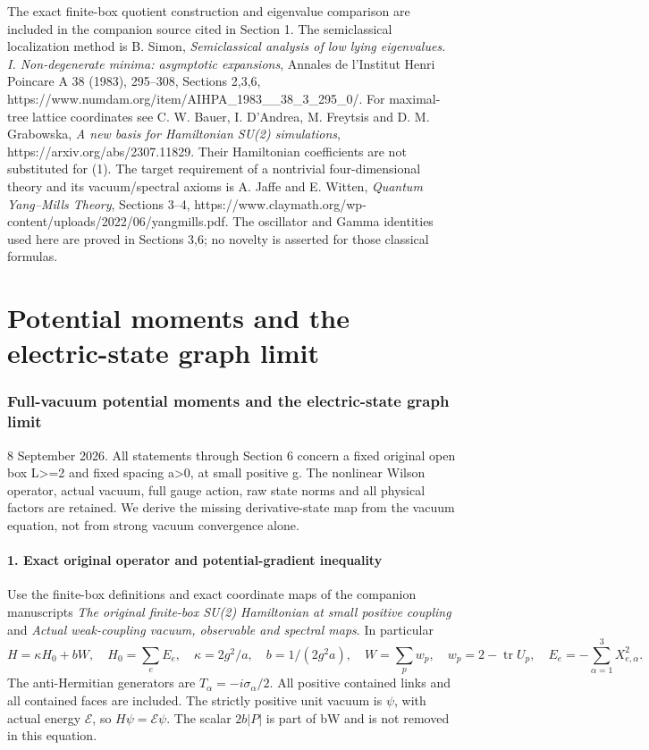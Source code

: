 \documentclass[
  11pt,
]{article}
\begin{document}
The exact finite-box quotient construction and eigenvalue comparison are
included in the companion source cited in Section 1. The semiclassical
localization method is B. Simon, \emph{Semiclassical analysis of low
lying eigenvalues. I. Non-degenerate minima: asymptotic expansions},
Annales de l'Institut Henri Poincare A 38 (1983), 295--308, Sections
2,3,6, https://www.numdam.org/item/AIHPA\_1983\_\_38\_3\_295\_0/. For
maximal-tree lattice coordinates see C. W. Bauer, I. D'Andrea, M.
Freytsis and D. M. Grabowska, \emph{A new basis for Hamiltonian SU(2)
simulations}, https://arxiv.org/abs/2307.11829. Their Hamiltonian
coefficients are not substituted for (1). The target requirement of a
nontrivial four-dimensional theory and its vacuum/spectral axioms is A.
Jaffe and E. Witten, \emph{Quantum Yang--Mills Theory}, Sections 3--4,
https://www.claymath.org/wp-content/uploads/2022/06/yangmills.pdf. The
oscillator and Gamma identities used here are proved in Sections 3,6; no
novelty is asserted for those classical formulas.

\clearpage
\part{Potential moments and the electric-state graph limit}
\section{Full-vacuum potential moments and the electric-state graph
limit}\label{weak-coupling-part-3-full-vacuum-potential-moments-and-the-electric-state-graph-limit}

8 September 2026. All statements through Section 6 concern a fixed
original open box L\textgreater=2 and fixed spacing a\textgreater0, at
small positive g. The nonlinear Wilson operator, actual vacuum, full
gauge action, raw state norms and all physical factors are retained. We
derive the missing derivative-state map from the vacuum equation, not
from strong vacuum convergence alone.

\subsection{1. Exact original operator and potential-gradient
inequality}\label{weak-coupling-part-3-exact-original-operator-and-potential-gradient-inequality}

Use the finite-box definitions and exact coordinate maps of the
companion manuscripts \emph{The original finite-box SU(2) Hamiltonian at
small positive coupling} and \emph{Actual weak-coupling vacuum,
observable and spectral maps}. In particular \[
 H=\kappa H_0+bW,\quad H_0=\sum_eE_e,
 \quad \kappa=2g^2/a,\quad b=1/(2g^2a),
 \quad W=\sum_p w_p,\quad w_p=2-\operatorname{tr}U_p,
 \quad E_e=-\sum_{\alpha=1}^3X_{e,\alpha}^2.                 \tag{1}
\] The anti-Hermitian generators are \(T_\alpha=-i\sigma_\alpha/2\). All
positive contained links and all contained faces are included. The
strictly positive unit vacuum is \(\psi\), with actual energy
\(\mathcal E\), so \(H\psi=\mathcal E\psi\). The scalar \(2b|P|\) is
part of bW and is not removed in this equation.
\end{document}
